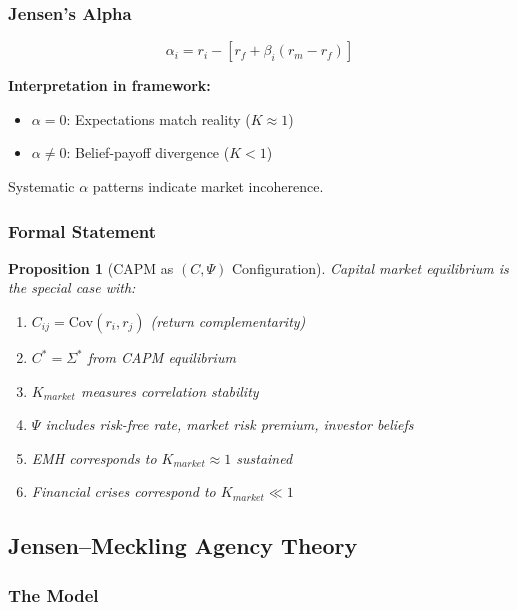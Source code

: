 \documentclass[12pt,a4paper]{article}
\newtheorem{proposition}[theorem]{Proposition}
\begin{document}
\subsubsection{Jensen's Alpha}

\begin{equation}
  \alpha_i = r_i - [r_f + \beta_i(r_m - r_f)]
\end{equation}

\textbf{Interpretation in framework:}
\begin{itemize}
  \item $\alpha = 0$: Expectations match reality ($K \approx 1$)
  \item $\alpha \neq 0$: Belief-payoff divergence ($K < 1$)
\end{itemize}

Systematic $\alpha$ patterns indicate market incoherence.

\subsubsection{Formal Statement}

\begin{proposition}[CAPM as $(C, \Psi)$ Configuration]
Capital market equilibrium is the special case with:
\begin{enumerate}
  \item $C_{ij} = \text{Cov}(r_i, r_j)$ (return complementarity)
  \item $C^* = \Sigma^*$ from CAPM equilibrium
  \item $K_{market}$ measures correlation stability
  \item $\Psi$ includes risk-free rate, market risk premium, investor beliefs
  \item EMH corresponds to $K_{market} \approx 1$ sustained
  \item Financial crises correspond to $K_{market} \ll 1$
\end{enumerate}
\end{proposition}

\subsection{Jensen--Meckling Agency Theory}
\label{app:jensenmeckling}

\subsubsection{The Model}
\end{document}
